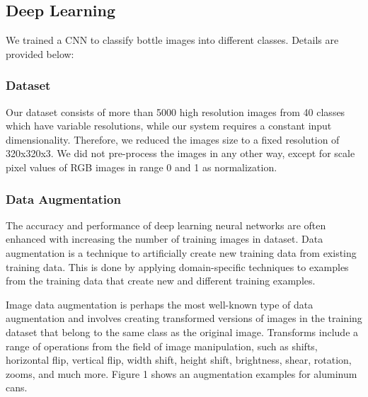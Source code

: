 \documentclass[conference]{IEEEtran}
\begin{document}
\subsection{Deep Learning}
We trained a CNN to classify bottle images into different classes. Details are provided below: 

\subsubsection{Dataset}
Our dataset consists of more than 5000 high resolution images from 40 classes which have variable resolutions, while our system requires a constant input dimensionality. Therefore, we reduced the images size to a fixed resolution of 320x320x3. We did not pre-process the images in any other way, except for scale pixel values of RGB images in range 0 and 1 as normalization.

\subsubsection{Data Augmentation}
The accuracy and performance of deep learning neural networks are often enhanced with increasing the number of training images in dataset. Data augmentation is a technique to artificially create new training data from existing training data. This is done by applying domain-specific techniques to examples from the training data that create new and different training examples.
\par 
Image data augmentation is perhaps the most well-known type of data augmentation and involves creating transformed versions of images in the training dataset that belong to the same class as the original image. Transforms include a range of operations from the field of image manipulation, such as shifts, horizontal flip, vertical flip, width shift, height shift, brightness, shear, rotation, zooms, and much more. Figure 1 shows an augmentation examples for aluminum cans.
\end{document}
